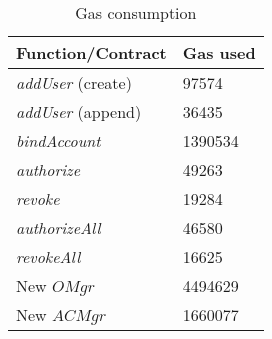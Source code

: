 \begin{table}[h]
    \centering
    \caption[Gas consumption]{Gas consumption}
    \label{table:gasUsed}
    \begin{tabular}{p{45mm}p{30mm}}
    \toprule[1.1pt]
    Function/Contract   & Gas used\\
    \midrule[1.1pt]
    \multirow{1}{*}{\textit{addUser} (create)} & 97574\\
    \midrule
    \multirow{1}{*}{\textit{addUser} (append)} & 36435\\
    \midrule
    \multirow{1}{*}{\textit{bindAccount}} & 1390534\\
    \midrule
    \multirow{1}{*}{\textit{authorize}} & 49263\\
    \midrule
    \multirow{1}{*}{\textit{revoke}} & 19284\\
    \midrule
    \multirow{1}{*}{\textit{authorizeAll}} & 46580\\    
    \midrule
    \multirow{1}{*}{\textit{revokeAll}} & 16625\\
    \midrule
    \multirow{1}{*}{New $OMgr$} & 4494629\\
    \midrule
    \multirow{1}{*}{New $ACMgr$} & 1660077\\    
    \bottomrule[1.1pt]
    \end{tabular}
    \end{table}